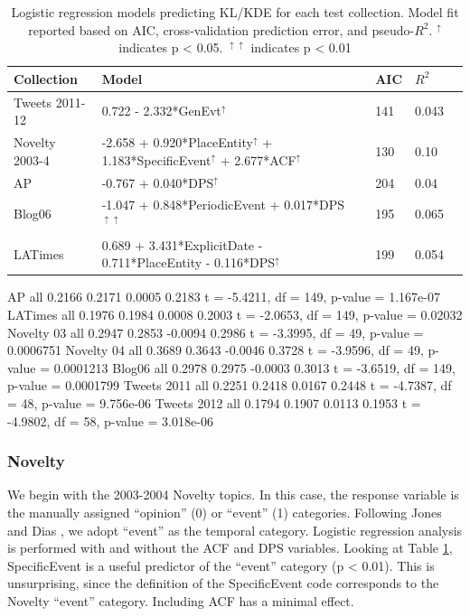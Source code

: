\documentclass[runningheads,a4paper]{llncs}
\begin{document}
\begin{table}
\small
\begin{tabular}{| l | l | l | l | l |} \hline
\bf{Collection} 	& \bf{Model} & \bf{AIC} & \bf{$R^2$} \\ \hline
Tweets 2011-12	& 0.722 - 2.332*GenEvt$^\uparrow$  & 141 & 0.043  \\ \hline
Novelty 2003-4 		& -2.658 + 0.920*PlaceEntity$^\uparrow$  + 1.183*SpecificEvent$^\uparrow$  + 2.677*ACF$^\uparrow$  & 130 & 0.10 \\ \hline
AP 			& -0.767 + 0.040*DPS$^\uparrow$  & 204& 0.04 \\ \hline
Blog06		& -1.047 + 0.848*PeriodicEvent + 0.017*DPS$^{\uparrow\uparrow}$ & 195 & 0.065 \\ \hline
LATimes 		& 0.689 + 3.431*ExplicitDate - 0.711*PlaceEntity - 0.116*DPS$^\uparrow$ & 199 &0.054 \\ \hline
\end{tabular}
\label{table.regresults}
\caption{Logistic regression models predicting KL/KDE for each test collection. Model fit reported based on AIC, cross-validation prediction error, and pseudo-$R^2$. $^\uparrow$ indicates p < 0.05. $^{\uparrow\uparrow}$ indicates p < 0.01}
\end{table}


AP 
	all	0.2166	0.2171	0.0005		0.2183
	t = -5.4211, df = 149, p-value = 1.167e-07	
LATimes
	all	0.1976	0.1984	0.0008		0.2003
	t = -2.0653, df = 149, p-value = 0.02032	
Novelty 03
	all	0.2947	0.2853	-0.0094		0.2986
	t = -3.3995, df = 49, p-value = 0.0006751
Novelty 04
	all	0.3689	0.3643	-0.0046		0.3728
	t = -3.9596, df = 49, p-value = 0.0001213	
Blog06
	all	0.2978	0.2975	-0.0003		0.3013
	t = -3.6519, df = 149, p-value = 0.0001799		
Tweets 2011
	all	0.2251	0.2418	0.0167		0.2448
	t = -4.7387, df = 48, p-value = 9.756e-06	
Tweets 2012
	all	0.1794	0.1907	0.0113		0.1953
	t = -4.9802, df = 58, p-value = 3.018e-06	
	
\subsubsection{Novelty}

We begin with the 2003-2004 Novelty topics. In this case, the response variable is the manually assigned ``opinion'' (0) or ``event'' (1) categories. Following Jones and Dias \cite{Jones2007}, we adopt ``event'' as the temporal category. Logistic regression analysis is performed with and without the ACF and DPS variables. Looking at Table \ref{table.regresults}, SpecificEvent is a useful predictor of the ``event'' category (p < 0.01). This is unsurprising, since the definition of the SpecificEvent code corresponds to the Novelty ``event'' category. Including ACF has a minimal effect. 
\end{document}

